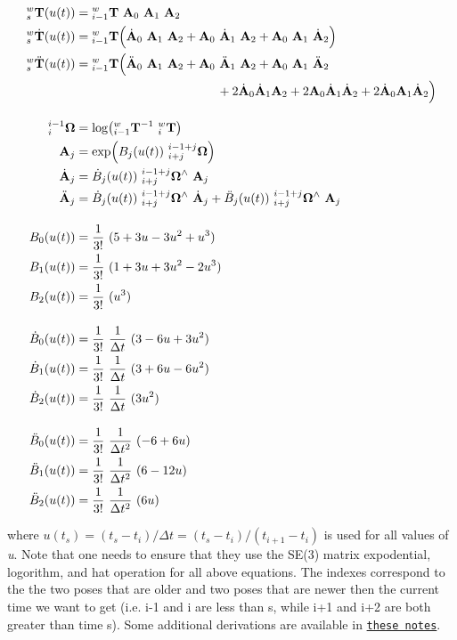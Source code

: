 \begin{align*} {}^{w}_{s}\mathbf{T}(u(t)) &= {}^{w}_{i-1}\mathbf{T}~\mathbf{A}_0~\mathbf{A}_1~\mathbf{A}_2 \\ \empty {}^{w}_{s}\dot{\mathbf{T}}(u(t)) &= {}^{w}_{i-1}\mathbf{T} \Big( \dot{\mathbf{A}}_0~\mathbf{A}_1~\mathbf{A}_2 + \mathbf{A}_0~\dot{\mathbf{A}}_1~\mathbf{A}_2 + \mathbf{A}_0~\mathbf{A}_1~\dot{\mathbf{A}}_2 \Big) \\ \empty {}^{w}_{s}\ddot{\mathbf{T}}(u(t)) &= {}^{w}_{i-1}\mathbf{T} \Big( \ddot{\mathbf{A}}_0~\mathbf{A}_1~\mathbf{A}_2 + \mathbf{A}_0~\ddot{\mathbf{A}}_1~\mathbf{A}_2 + \mathbf{A}_0~\mathbf{A}_1~\ddot{\mathbf{A}}_2 \nonumber\\ &\hspace{4cm} + 2\dot{\mathbf{A}}_0\dot{\mathbf{A}}_1\mathbf{A}_2 + 2\mathbf{A}_0\dot{\mathbf{A}}_1\dot{\mathbf{A}}_2 + 2\dot{\mathbf{A}}_0\mathbf{A}_1\dot{\mathbf{A}}_2 \Big) \\[1em] \empty {}^{i-1}_{i}\mathbf{\Omega} &= \mathrm{log}\big( {}^{w}_{i-1}\mathbf{T}^{-1}~{}^{w}_{i}\mathbf{T} \big) \\ \mathbf{A}_j &= \mathrm{exp}\Big({B}_j(u(t))~{}^{i-1+j}_{i+j}\mathbf{\Omega} \Big) \\ \dot{\mathbf{A}}_j &= \dot{B}_j(u(t)) ~{}^{i-1+j}_{i+j}\mathbf{\Omega}^\wedge ~\mathbf{A}_j \\ \ddot{\mathbf{A}}_j &= \dot{B}_j(u(t)) ~{}^{i-1+j}_{i+j}\mathbf{\Omega}^\wedge ~\dot{\mathbf{A}}_j + \ddot{B}_j(u(t)) ~{}^{i-1+j}_{i+j}\mathbf{\Omega}^\wedge ~\mathbf{A}_j \\[1em] \empty {B}_0(u(t)) &= \frac{1}{3!}~(5+3u-3u^2+u^3) \\ {B}_1(u(t)) &= \frac{1}{3!}~(1+3u+3u^2-2u^3) \\ {B}_2(u(t)) &= \frac{1}{3!}~(u^3) \\[1em] \empty \dot{{B}}_0(u(t)) &= \frac{1}{3!}~\frac{1}{\Delta t}~(3-6u+3u^2) \\ \dot{{B}}_1(u(t)) &= \frac{1}{3!}~\frac{1}{\Delta t}~(3+6u-6u^2) \\ \dot{{B}}_2(u(t)) &= \frac{1}{3!}~\frac{1}{\Delta t}~(3u^2) \\[1em] \empty \ddot{{B}}_0(u(t)) &= \frac{1}{3!}~\frac{1}{\Delta t^2}~(-6+6u) \\ \ddot{{B}}_1(u(t)) &= \frac{1}{3!}~\frac{1}{\Delta t^2}~(6-12u) \\ \ddot{{B}}_2(u(t)) &= \frac{1}{3!}~\frac{1}{\Delta t^2}~(6u) \end{align*}

where $u(t_s)=(t_s-t_i)/\Delta t=(t_s-t_i)/(t_{i+1}-t_i)$ is used for all values of {\itshape u}. Note that one needs to ensure that they use the S\+E(3) matrix expodential, logorithm, and hat operation for all above equations. The indexes correspond to the the two poses that are older and two poses that are newer then the current time we want to get (i.\+e. i-\/1 and i are less than s, while i+1 and i+2 are both greater than time s). Some additional derivations are available in \href{http://udel.edu/~pgeneva/downloads/notes/2018_notes_mueffler2017arxiv.pdf}{\tt these notes}. 

